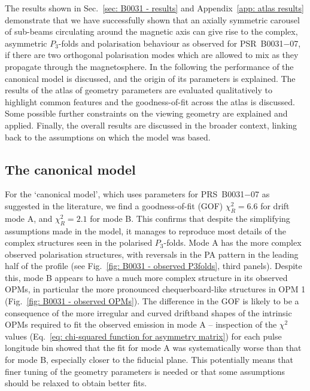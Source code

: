 The results shown in Sec.~\ref{sec: B0031 - results} and Appendix~\ref{app: atlas results} demonstrate that we have successfully shown that an axially symmetric carousel of sub-beams circulating around the magnetic axis can give rise to the complex, asymmetric $P_3$-folds and polarisation behaviour as observed for PSR~B0031$-$07, if there are two orthogonal polarisation modes which are allowed to mix as they propagate through the magnetosphere. In the following the performance of the canonical model is discussed, and the origin of its parameters is explained. The results of the atlas of geometry parameters are evaluated qualitatively to highlight common features and the goodness-of-fit across the atlas is discussed. Some possible further constraints on the viewing geometry are explained and applied. Finally, the overall results are discussed in the broader context, linking back to the assumptions on which the model was based.


\subsection{The canonical model}
\label{sec: B0031 - discuss - canonical model}

For the `canonical model', which uses parameters for PRS~B0031$-$07 as suggested in the literature, we find a goodness-of-fit (GOF) $\chi^2_R = 6.6$ for drift mode A, and $\chi^2_R = 2.1$ for mode B. This confirms that despite the simplifying assumptions made in the model, it manages to reproduce most details of the complex structures seen in the polarised $P_3$-folds. Mode A has the more complex observed polarisation structures, with reversals in the PA pattern in the leading half of the profile (see Fig.~\ref{fig: B0031 - observed P3folds}, third panels). Despite this, mode B appears to have a much more complex structure in its observed OPMs, in particular the more pronounced chequerboard-like structures in OPM 1 (Fig.~\ref{fig: B0031 - observed OPMs}). The difference in the GOF is likely to be a consequence of the more irregular and curved driftband shapes of the intrinsic OPMs required to fit the observed emission in mode A -- inspection of the $\chi^2$ values (Eq.~\eqref{eq: chi-squared function for asymmetry matrix}) for each pulse longitude bin showed that the fit for mode A was systematically worse than that for mode B, especially closer to the fiducial plane. This potentially means that finer tuning of the geometry parameters is needed or that some assumptions should be relaxed to obtain better fits.

